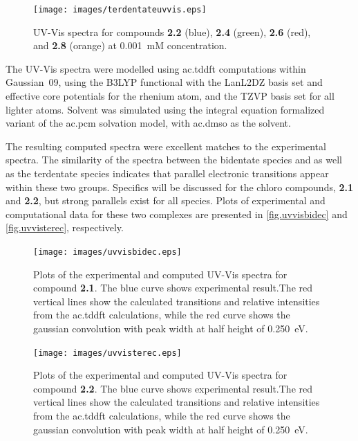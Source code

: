 \begin{figure}[!htb]
\centering
 \texttt{[image: images/terdentateuvvis.eps]}
 \caption[UV-Vis spectra for compounds \textbf{2.2}, \textbf{2.4}, \textbf{2.6}, and \textbf{2.8}.]{UV-Vis spectra for compounds \textbf{2.2} (blue), \textbf{2.4} (green), \textbf{2.6} (red), and \textbf{2.8} (orange) at 0.001~mM concentration.}
 \label{fig.uvvisters}
\end{figure} 

The UV-Vis spectra were modelled using \gls{ac.tddft} computations within Gaussian~09, using the B3LYP functional with the LanL2DZ basis set and effective core potentials for the rhenium atom, and the TZVP basis set for all lighter atoms. Solvent was simulated using the integral equation formalized variant of the \gls{ac.pcm} solvation model, with \gls{ac.dmso} as the solvent. 

The resulting computed spectra were excellent matches to the experimental spectra. The similarity of the spectra between the bidentate species and as well as the terdentate species indicates that parallel electronic transitions appear within these two groups. Specifics will be discussed for the chloro compounds, \textbf{2.1} and \textbf{2.2}, but strong parallels exist for all species. Plots of experimental and computational data for these two complexes are presented in \autoref{fig.uvvisbidec} and \autoref{fig.uvvisterec}, respectively.

\begin{figure}[!htb]
 \centering
  \texttt{[image: images/uvvisbidec.eps]}
 \caption[Plots of the experimental and computed UV-Vis spectra for compound \textbf{2.1}.]{Plots of the experimental and computed UV-Vis spectra for compound \textbf{2.1}. The blue curve shows experimental result.The red vertical lines show the calculated transitions and relative intensities from the \gls{ac.tddft} calculations, while the red curve shows the gaussian convolution with peak width at half height of 0.250~eV.}
 \label{fig.uvvisbidec}
\end{figure}

\begin{figure}[!htb]
 \centering
  \texttt{[image: images/uvvisterec.eps]}
 \caption[Plots of the experimental and computed UV-Vis spectra for compound \textbf{2.2}.]{Plots of the experimental and computed UV-Vis spectra for compound \textbf{2.2}.  The blue curve shows experimental result.The red vertical lines show the calculated transitions and relative intensities from the \gls{ac.tddft} calculations, while the red curve shows the gaussian convolution with peak width at half height of 0.250~eV.}
 \label{fig.uvvisterec}
\end{figure}

